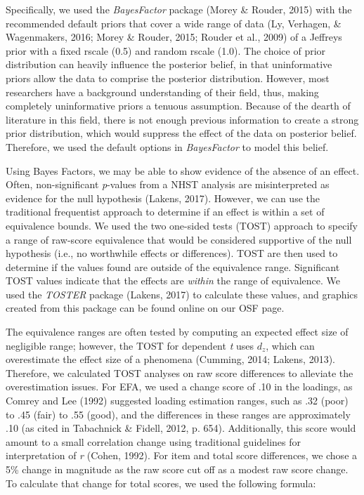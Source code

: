 \documentclass[english,man]{apa6}
\theoremstyle{definition}
\theoremstyle{definition}
\theoremstyle{definition}
\theoremstyle{remark}
\begin{document}
Specifically, we used the \emph{BayesFactor} package (Morey \& Rouder,
2015) with the recommended default priors that cover a wide range of
data (Ly, Verhagen, \& Wagenmakers, 2016; Morey \& Rouder, 2015; Rouder
et al., 2009) of a Jeffreys prior with a fixed rscale (0.5) and random
rscale (1.0). The choice of prior distribution can heavily influence the
posterior belief, in that uninformative priors allow the data to
comprise the posterior distribution. However, most researchers have a
background understanding of their field, thus, making completely
uninformative priors a tenuous assumption. Because of the dearth of
literature in this field, there is not enough previous information to
create a strong prior distribution, which would suppress the effect of
the data on posterior belief. Therefore, we used the default options in
\emph{BayesFactor} to model this belief.

Using Bayes Factors, we may be able to show evidence of the absence of
an effect. Often, non-significant \emph{p}-values from a NHST analysis
are misinterpreted as evidence for the null hypothesis (Lakens, 2017).
However, we can use the traditional frequentist approach to determine if
an effect is within a set of equivalence bounds. We used the two
one-sided tests (TOST) approach to specify a range of raw-score
equivalence that would be considered supportive of the null hypothesis
(i.e., no worthwhile effects or differences). TOST are then used to
determine if the values found are outside of the equivalence range.
Significant TOST values indicate that the effects are \emph{within} the
range of equivalence. We used the \emph{TOSTER} package (Lakens, 2017)
to calculate these values, and graphics created from this package can be
found online on our OSF page.

The equivalence ranges are often tested by computing an expected effect
size of negligible range; however, the TOST for dependent \emph{t} uses
\(d_z\), which can overestimate the effect size of a phenomena (Cumming,
2014; Lakens, 2013). Therefore, we calculated TOST analyses on raw score
differences to alleviate the overestimation issues. For EFA, we used a
change score of .10 in the loadings, as Comrey and Lee (1992) suggested
loading estimation ranges, such as .32 (poor) to .45 (fair) to .55
(good), and the differences in these ranges are approximately .10 (as
cited in Tabachnick \& Fidell, 2012, p. 654). Additionally, this score
would amount to a small correlation change using traditional guidelines
for interpretation of \emph{r} (Cohen, 1992). For item and total score
differences, we chose a 5\% change in magnitude as the raw score cut off
as a modest raw score change. To calculate that change for total scores,
we used the following formula:
\end{document}
